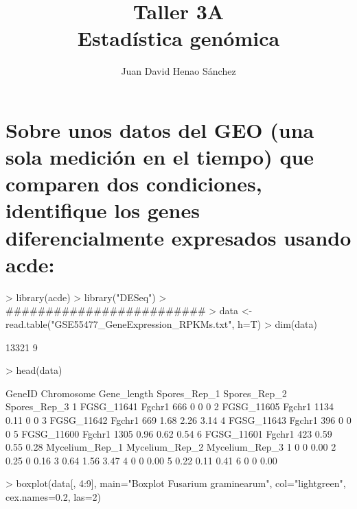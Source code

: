 \documentclass{article}
\title{Taller 3A\\ Estadística genómica}
\author{Juan David Henao Sánchez}
\begin{document}


\maketitle

\section*{Sobre unos datos del GEO (una sola medición en el tiempo) que comparen dos condiciones, identifique los genes diferencialmente expresados usando acde:
}

\begin{Schunk}
\begin{Sinput}
> library(acde)
> library("DESeq")
> #########################
> data <- read.table("GSE55477_GeneExpression_RPKMs.txt", h=T)
> dim(data)
\end{Sinput}
\begin{Soutput}
[1] 13321     9
\end{Soutput}
\begin{Sinput}
> head(data)
\end{Sinput}
\begin{Soutput}
      GeneID Chromosome Gene_length Spores_Rep_1 Spores_Rep_2 Spores_Rep_3
1 FGSG_11641     Fgchr1         666            0            0            0
2 FGSG_11605     Fgchr1        1134         0.11            0            0
3 FGSG_11642     Fgchr1         669         1.68         2.26         3.14
4 FGSG_11643     Fgchr1         396            0            0            0
5 FGSG_11600     Fgchr1        1305         0.96         0.62         0.54
6 FGSG_11601     Fgchr1         423         0.59         0.55         0.28
  Mycelium_Rep_1 Mycelium_Rep_2 Mycelium_Rep_3
1              0              0           0.00
2           0.25              0           0.16
3           0.64           1.56           3.47
4              0              0           0.00
5           0.22           0.11           0.41
6              0              0           0.00
\end{Soutput}
\end{Schunk}
\begin{Schunk}
\begin{Sinput}
> boxplot(data[, 4:9], main="Boxplot Fusarium graminearum", col="lightgreen", cex.names=0.2, las=2)
\end{Sinput}
\end{Schunk}
\end{document}

